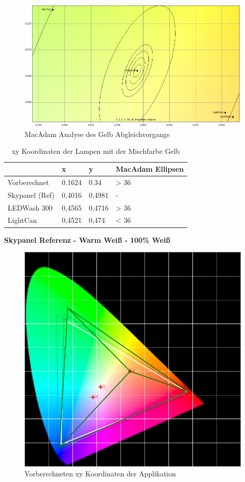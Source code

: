 \documentclass[11pt]{scrartcl}
\begin{document}
\begin{figure}[H]
    \begin{center}
        \includegraphics[width=\textwidth]{images/macAdam/comparedYellow.png}
    \end{center}
    \caption{MacAdam Analyse des Gelb Abgleichvorgangs}
\end{figure}
\noindent
\begin{table}[H]
    \begin{tabularx}{\textwidth}{|X|X|X|X|}
        \hline           & x        & y        & MacAdam Ellipsen\\\hline
        Vorberechnet     & 0.1624   & 0.34     & > 36\\\hline
        Skypanel (Ref)   & 0,4016   & 0,4981   & -\\\hline
        LEDWash 300      & 0,4565   & 0,4716   & > 36\\\hline
        LightCan         & 0,4521   & 0,474    & < 36\\\hline
    \end{tabularx}
    \caption{xy Koordinaten der Lampen mit der Mischfarbe Gelb}
\end{table}
\clearpage
\textbf{Skypanel Referenz - Warm Weiß - 100\% Weiß}
\begin{figure}[H]
    \begin{center}
        \includegraphics[width=.8\textwidth]{images/app_mix_warmWhite_cie.png}
    \end{center}
    \caption{Vorberechneten xy Koordinaten der Applikation}
\end{figure}
\end{document}

